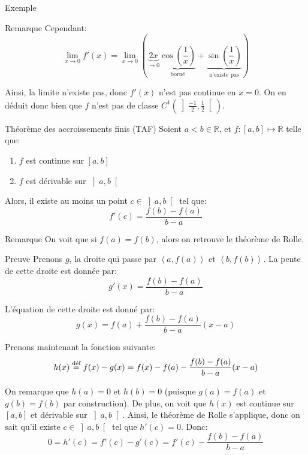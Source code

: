 \documentclass[a4paper]{article}
\begin{document}
\begin{parag}{Exemple}
\begin{subparag}{Remarque}
        Cependant: 
        \[\lim_{x \to 0} f'\left(x\right) = \lim_{x \to 0} \left(\underbrace{2x}_{\to 0} \underbrace{\cos\left(\frac{1}{x}\right)}_{\text{borné}} + \underbrace{\sin\left(\frac{1}{x}\right)}_{\text{n'existe pas}}\right)\]
        
        Ainsi, la limite n'existe pas, donc $f'\left(x\right)$ n'est pas continue en $x = 0$. On en déduit donc bien que $f$ n'est pas de classe $C^1\left(\left]\frac{-1}{2}, \frac{1}{2}\right[\right) $.
    \end{subparag}
    
\end{parag}

\begin{parag}{Théorème des accroissements finis (TAF)}
    Soient $a < b \in \mathbb{R}$, et $f: \left[a, b\right] \mapsto \mathbb{R}$ telle que:
    \begin{enumerate}
        \item $f$ est continue sur $\left[a, b\right]$
        \item $f$ est dérivable sur $\left]a, b\right[ $
    \end{enumerate}

    Alors, il existe au moins un point $c \in \left]a, b\right[ $ tel que: 
    \[f'\left(c\right) = \frac{f\left(b\right) - f\left(a\right)}{b - a}\]
    
    \begin{subparag}{Remarque}
        On voit que si $f\left(a\right) = f\left(b\right)$, alors on retrouve le théorème de Rolle.
    \end{subparag}
    
    \begin{subparag}{Preuve}
        Prenons $g$, la droite qui passe par $\left<a, f\left(a\right)\right>$ et $\left<b, f\left(b\right)\right>$. La pente de cette droite est donnée par:
        \[g'\left(x\right) = \frac{f\left(b\right) - f\left(a\right)}{b - a}\]
        
        L'équation de cette droite est donné par: 
        \[g\left(x\right) = f\left(a\right) + \frac{f\left(b\right) - f\left(a\right)}{b - a} \left(x - a\right)\]

        Prenons maintenant la fonction suivante: 
        \[h\left(x\right) \over{=}{déf} f\left(x\right) - g\left(x\right) = f\left(x\right) - f\left(a\right) - \frac{f\left(b\right) - f\left(a\right)}{b - a} \left(x - a\right)\]

        On remarque que $h\left(a\right) = 0$ et $h\left(b\right) = 0$ (puisque $g\left(a\right) = f\left(a\right)$ et $g\left(b\right) = f\left(b\right)$ par construction). De plus, on voit que $h\left(x\right)$ est continue sur $\left[a,b\right] $ et dérivable sur $\left]a, b\right[ $. Ainsi, le théorème de Rolle s'applique, donc on sait qu'il existe $c \in \left]a, b\right[ $ tel que $h'\left(c\right) = 0$. Donc: 
        \[0 = h'\left(c\right) = f'\left(c\right) - g'\left(c\right) = f'\left(c\right) - \frac{f\left(b\right) - f\left(a\right)}{b - a}\]


\end{subparag}
\end{parag}
\end{document}
